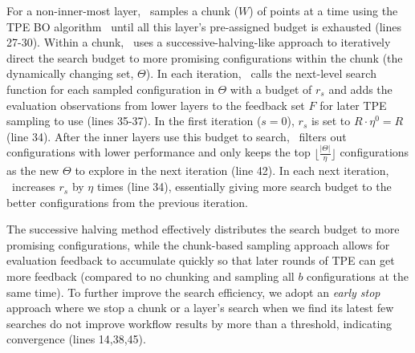 

For a non-inner-most layer, \search\ samples a chunk ($W$) of points at a time using the TPE BO algorithm~\cite{bergstra2011tpe} until all this layer's pre-assigned budget is exhausted (lines 27-30). Within a chunk, \search\ uses a successive-halving-like approach to iteratively direct the search budget to more promising configurations within the chunk (the dynamically changing set, $\Theta$). In each iteration, \search\ calls the next-level search function for each sampled configuration in $\Theta$ with a budget of $r_s$ and adds the evaluation observations from lower layers to the feedback set $F$ for later TPE sampling to use (lines 35-37).
In the first iteration ($s=0$), $r_s$ is set to $R\cdot \eta^0=R$ (line 34). After the inner layers use this budget to search, \search\ filters out configurations with lower performance and only keeps the top $\lfloor \frac{|\Theta|}{\eta}\rfloor$ configurations as the new $\Theta$ to explore in the next iteration (line 42). In each next iteration, \search\ increases $r_s$ by $\eta$ times (line 34), essentially giving more search budget to the better configurations from the previous iteration.

The successive halving method effectively distributes the search budget to more promising configurations, while the chunk-based sampling approach allows for evaluation feedback to accumulate quickly so that later rounds of TPE can get more feedback (compared to no chunking and sampling all $b$ configurations at the same time). To further improve the search efficiency, we adopt an {\em early stop} approach where we stop a chunk or a layer's search when we find its latest few searches do not improve workflow results by more than a threshold, indicating convergence (lines 14,38,45).



